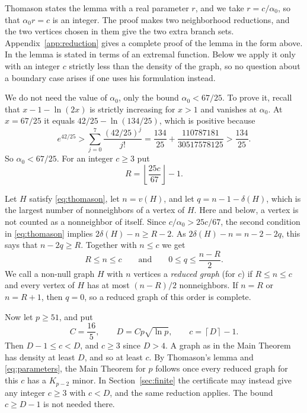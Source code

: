 \documentclass[11pt]{article}
\newcommand{\floor}[1]{\left\lfloor#1\right\rfloor}
\newcommand{\ceil}[1]{\left\lceil#1\right\rceil}
\begin{document}
Thomason states the lemma with a real parameter $r$, and we take
$r=c/\alpha_0$, so that $\alpha_0r=c$ is an integer. The proof makes two
neighborhood reductions, and the two vertices chosen in them give the two
extra branch sets. Appendix~\ref{app:reduction} gives a complete proof of the
lemma in the form above. In \cite{thomason} the lemma is stated in terms of
an extremal function. Below we apply it only with an integer $c$ strictly less than the
density of the graph, so no question about a boundary case arises if one
uses his formulation instead.

We do not need the value of $\alpha_0$, only the bound $\alpha_0<67/25$. To
prove it, recall that $x-1-\ln(2x)$ is strictly increasing for $x>1$ and
vanishes at $\alpha_0$. At $x=67/25$ it equals $42/25-\ln(134/25)$, which is
positive because
\begin{equation*}
 e^{42/25}>
 \sum_{j=0}^{7}\frac{(42/25)^j}{j!}
 =\frac{134}{25}+\frac{110787181}{30517578125}
 >\frac{134}{25}.
\end{equation*}
So $\alpha_0<67/25$. For an integer $c\ge3$ put
\begin{equation}\label{eq:R}
 R=\floor{\frac{25c}{67}}-1.
\end{equation}

Let $H$ satisfy \eqref{eq:thomason}, let $n=v(H)$, and let
$q=n-1-\delta(H)$, which is the largest number of nonneighbors of a vertex of
$H$. Here and below, a vertex is not counted as a nonneighbor of itself.
Since $c/\alpha_0>25c/67$, the second condition in \eqref{eq:thomason}
implies $2\delta(H)-n\ge R-2$. As $2\delta(H)-n=n-2-2q$, this says that
$n-2q\ge R$. Together with $n\le c$ we get
\begin{equation}\label{eq:parameters}
 R\le n\le c\qquad\text{and}\qquad 0\le q\le\frac{n-R}{2}.
\end{equation}
We call a non-null graph $H$ with $n$ vertices a \emph{reduced graph} (for
$c$) if $R\le n\le c$ and every vertex of $H$ has at most $(n-R)/2$
nonneighbors. If $n=R$ or $n=R+1$, then $q=0$, so a reduced graph of this
order is complete.

Now let $p\ge51$, and put
\begin{equation}\label{eq:D}
 C=\frac{16}{5},\qquad D=Cp\sqrt{\ln p},\qquad c=\ceil{D}-1.
\end{equation}
Then $D-1\le c<D$, and $c\ge3$ since $D>4$. A graph as in the Main Theorem
has density at least $D$, and so at least $c$. By Thomason's lemma and
\eqref{eq:parameters}, the Main Theorem for $p$ follows once every reduced
graph for this $c$ has a $K_{p-2}$ minor. In Section~\ref{sec:finite} the
certificate may instead give any integer $c\ge3$ with $c<D$, and the same
reduction applies. The bound $c\ge D-1$ is not needed there.
\end{document}
